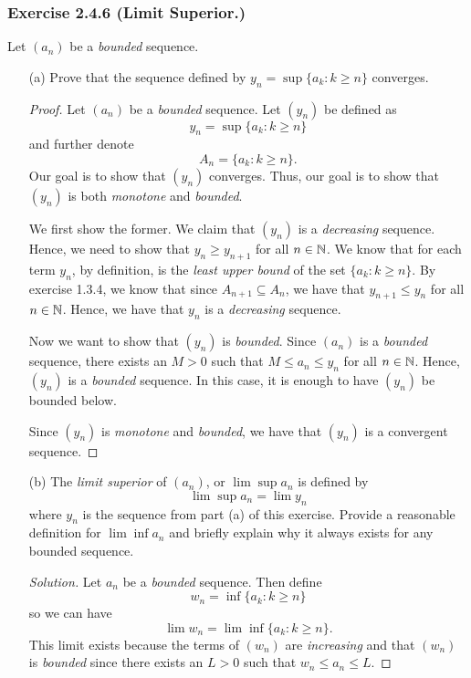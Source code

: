 \subsubsection{Exercise 2.4.6 (Limit Superior.) }
Let \( (a_n)\) be a \textit{bounded} sequence. 
\begin{enumerate}
    \item[(a)] Prove that the sequence defined by \( y_n = \sup \{ a_k : k \geq n \}\) converges. 
        \begin{proof}
        Let \( (a_n)\) be a \textit{bounded} sequence. Let \( (y_n)\) be defined as 
        \[ y_n = \sup \{ a_k : k \geq n \}\] and further denote
        \[ A_n = \{ a_k : k \geq n\}.\]
        Our goal is to show that \( (y_n)\) converges. Thus, our goal is to show that \( (y_n)\) is both \textit{monotone} and \textit{bounded}.

        We first show the former. We claim that \( (y_n)\) is a \textit{decreasing} sequence. Hence, we need to show that \( y_n \geq y_{n+1}\) for all \( n \in \mathbb{N} \). We know that for each term \( y_n \), by definition, is the \textit{least upper bound} of the set \( \{a_k: k \geq n\}\). By exercise 1.3.4, we know that since \( A_{n+1} \subseteq A_n \), we have that \( y_{n+1} \leq y_n\) for all \( n \in \mathbb{N} \). Hence, we have that \( y_n\) is a \textit{decreasing} sequence.

        Now we want to show that \( (y_n)\) is \textit{bounded}. Since \( (a_n)\) is a \textit{bounded} sequence, there exists an \( M > 0 \) such that \( M \leq a_n \leq y_n  \) for all \( n \in \mathbb{N} \). Hence, \( (y_n)\) is a \textit{bounded} sequence. In this case, it is enough to have \( (y_n)\) be bounded below.

        Since \( (y_n)\) is \textit{monotone} and \textit{bounded}, we have that \( (y_n)\) is a convergent sequence.

        \end{proof}
    \item[(b)] The \textit{limit superior} of \( (a_n)\), or \( \lim \sup a_n   \) is defined by 
        \[ \lim  \sup a_n = \lim y_n   \] where \( y_n \) is the sequence from part (a) of this exercise. Provide a reasonable definition for \( \lim \inf a_n  \) and briefly explain why it always exists for any bounded sequence.
      \begin{proof}[Solution]
       Let \( a_n \) be a \textit{bounded} sequence. Then define   
       \[ w_n = \inf \{ a_k : k \geq n  \}\]
       so we can have 
       \[ \lim w_n = \lim \inf\{a_k : k \geq n\}. \]
      This limit exists because the terms of \( (w_n) \) are \textit{increasing} and that \( (w_n) \) is \textit{bounded} since there exists an \( L > 0 \) such that \( w_n \leq a_n \leq L \).



\end{proof}
\end{enumerate}
